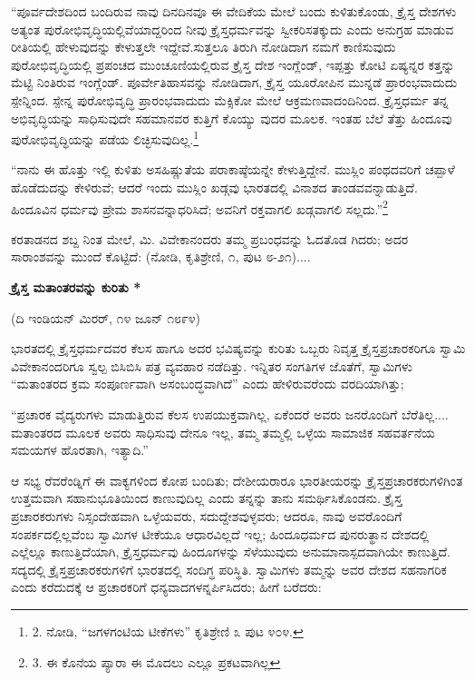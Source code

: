 “ಪೂರ್ವದೇಶದಿಂದ ಬಂದಿರುವ ನಾವು ದಿನದಿನವೂ ಈ ವೇದಿಕೆಯ ಮೇಲೆ ಬಂದು ಕುಳಿತುಕೊಂಡು, ಕ್ರೈಸ್ತ ದೇಶಗಳು ಅತ್ಯಂತ ಪುರೋಭಿವೃದ್ಧಿಯಲ್ಲಿವೆಯಾದ್ದರಿಂದ ನೀವು ಕ್ರೈಸ್ತಧರ್ಮವನ್ನು ಸ್ವೀಕರಿಸತಕ್ಕುದು ಎಂದು ಅನುಗ್ರಹ ಮಾಡುವ ರೀತಿಯಲ್ಲಿ ಹೇಳುವುದನ್ನು ಕೇಳುತ್ತಲೇ ಇದ್ದೇವೆ.ಸುತ್ತಲೂ ತಿರುಗಿ ನೋಡಿದಾಗ ನಮಗೆ ಕಾಣಿಸುವುದು ಪುರೋಭಿವೃದ್ಧಿಯಲ್ಲಿ ಪ್ರಪಂಚದ ಮುಂಚೂಣಿಯಲ್ಲಿರುವ ಕ್ರೈಸ್ತ ದೇಶ ಇಂಗ್ಲೆಂಡ್, ಇಪ್ಪತ್ತು ಕೋಟಿ ಏಷ್ಯನ್ನರ ಕತ್ತನ್ನು ಮೆಟ್ಟಿ ನಿಂತಿರುವ ಇಂಗ್ಲೆಂಡ್. ಪೂರ್ವೇತಿಹಾಸವನ್ನು ನೋಡಿದಾಗ, ಕ್ರೈಸ್ತ ಯೂರೋಪಿನ ಮುನ್ನಡೆ ಪ್ರಾರಂಭವಾದುದು ಸ್ಪೇನ್ನಿಂದ. ಸ್ಪೇನ್ನ ಪುರೋಭಿವೃದ್ಧಿ ಪ್ರಾರಂಭವಾದುದು ಮೆಕ್ಸಿಕೋ ಮೇಲೆ ಆಕ್ರಮಣವಾದಂದಿನಿಂದ. ಕ್ರೈಸ್ತಧರ್ಮ ತನ್ನ ಅಭಿವೃದ್ಧಿಯನ್ನು ಸಾಧಿಸುವುದೇ ಸಹಮಾನವರ ಕುತ್ತಿಗೆ ಕೊಯ್ಯು ವುದರ ಮೂಲಕ. ಇಂತಹ ಬೆಲೆ ತೆತ್ತು ಹಿಂದೂವು ಪುರೋಭಿವೃದ್ಧಿಯನ್ನು ಪಡೆಯ ಲಿಚ್ಛಿಸುವುದಿಲ್ಲ.\footnote{2. ನೋಡಿ, “ಜಗಳಗಂಟಿಯ ಟೀಕೆಗಳು” ಕೃತಿಶ್ರೇಣಿ ೩ ಪುಟ ೪೦೪.}

“ನಾನು ಈ ಹೊತ್ತು ಇಲ್ಲಿ ಕುಳಿತು ಅಸಹಿಷ್ಣುತೆಯ ಪರಾಕಾಷ್ಠೆಯನ್ನೇ ಕೇಳುತ್ತಿದ್ದೇನೆ. ಮುಸ್ಲಿಂ ಪಂಥದವರಿಗೆ ಚಪ್ಪಾಳೆ ಹೊಡೆದುದನ್ನು ಕೇಳಿರುವೆ; ಆದರೆ ಇಂದು ಮುಸ್ಲಿಂ ಖಡ್ಗವು ಭಾರತದಲ್ಲಿ ವಿನಾಶದ ತಾಂಡವವನ್ನಾಡುತ್ತಿದೆ. ಹಿಂದೂವಿನ ಧರ್ಮವು ಪ್ರೇಮ ಶಾಸನವನ್ನಾಧರಿಸಿದೆ; ಅವನಿಗೆ ರಕ್ತವಾಗಲಿ ಖಡ್ಗವಾಗಲಿ ಸಲ್ಲದು.”\footnote{3. ಈ ಕೊನೆಯ ಪ್ಯಾರಾ ಈ ಮೊದಲು ಎಲ್ಲೂ ಪ್ರಕಟವಾಗಿಲ್ಲ}

ಕರತಾಡನದ ಶಬ್ದ ನಿಂತ ಮೇಲೆ, ಮಿ. ವಿವೇಕಾನಂದರು ತಮ್ಮ ಪ್ರಬಂಧವನ್ನು ಓದತೊಡ ಗಿದರು; ಅದರ ಸಾರಾಂಶವನ್ನು ಮುಂದೆ ಕೊಟ್ಟಿದೆ: (ನೋಡಿ, ಕೃತಿಶ್ರೇಣಿ, ೧, ಪುಟ ೮-೨೧)....

\begin{center}
\textbf{ಕ್ರೈಸ್ತ ಮತಾಂತರವನ್ನು ಕುರಿತು *}
\end{center}

\begin{center}
(ದಿ ಇಂಡಿಯನ್ ಮಿರರ್, ೧೪ ಜೂನ್ ೧೮೯೪)
\end{center}

ಭಾರತದಲ್ಲಿ ಕ್ರೈಸ್ತಧರ್ಮದವರ ಕೆಲಸ ಹಾಗೂ ಅದರ ಭವಿಷ್ಯವನ್ನು ಕುರಿತು ಒಬ್ಬರು ನಿವೃತ್ತ ಕ್ರೈಸ್ತಪ್ರಚಾರಕರಿಗೂ ಸ್ವಾಮಿ ವಿವೇಕಾನಂದರಿಗೂ ಸ್ವಲ್ಪ ಬಿಸಿಬಿಸಿ ಪತ್ರ ವ್ಯವಹಾರ ನಡೆದಿತ್ತು. ಇನ್ನಿತರ ಸಂಗತಿಗಳ ಜೊತೆಗೆ, ಸ್ವಾಮಿಗಳು “ಮತಾಂತರದ ಕ್ರಮ ಸಂಪೂರ್ಣವಾಗಿ ಅಸಂಬಂದ್ಧವಾಗಿದೆ” ಎಂದು ಹೇಳಿರುವರೆಂದು ವರದಿಯಾಗಿತ್ತು;

“ಪ್ರಚಾರಕ ವೈದ್ಯರುಗಳು ಮಾಡುತ್ತಿರುವ ಕೆಲಸ ಉಪಯುಕ್ತವಾಗಿಲ್ಲ, ಏಕೆಂದರೆ ಅವರು ಜನರೊಂದಿಗೆ ಬೆರೆತಿಲ್ಲ.... ಮತಾಂತರದ ಮೂಲಕ ಅವರು ಸಾಧಿಸುವು ದೇನೂ ಇಲ್ಲ, ತಮ್ಮ ತಮ್ಮಲ್ಲಿ ಒಳ್ಳೆಯ ಸಾಮಾಜಿಕ ಸಹವರ್ತನೆಯ ಸಮಯಗಳ ಹೊರತಾಗಿ, ಇತ್ಯಾದಿ.”

ಆ ಸಭ್ಯ ರೆವರೆಂಡ್ನಿಗೆ ಈ ವಾಕ್ಯಗಳಿಂದ ಕೋಪ ಬಂದಿತು; ದೇಶೀಯರಾರೂ ಭಾರತೀಯರನ್ನು ಕ್ರೈಸ್ತಪ್ರಚಾರಕರುಗಳಿಗಿಂತ ಉತ್ತಮವಾಗಿ ಸಹಾನುಭೂತಿಯಿಂದ ಕಾಣುವುದಿಲ್ಲ ಎಂದು ತನ್ನನ್ನು ತಾನು ಸಮರ್ಥಿಸಿಕೊಂಡನು. ಕ್ರೈಸ್ತ ಪ್ರಚಾರಕರುಗಳು ನಿಸ್ಸಂದೇಹವಾಗಿ ಒಳ್ಳೆಯವರು, ಸದುದ್ದೇಶವುಳ್ಳವರು; ಆದರೂ, ನಾವು ಅವರೊಂದಿಗೆ ಸಂಪರ್ಕದಲ್ಲಿಲ್ಲವೆಂಬ ಸ್ವಾಮಿಗಳ ಟೀಕೆಯೂ ಆಧಾರವಿಲ್ಲದೆ ಇಲ್ಲ; ಹಿಂದೂಧರ್ಮದ ಪುನರುತ್ಥಾನ ದೇಶದಲ್ಲಿ ಎಲ್ಲೆಲ್ಲೂ ಕಾಣುತ್ತಿದೆಯಾಗಿ, ಕ್ರೈಸ್ತಧರ್ಮವು ಹಿಂದೂಗಳನ್ನು ಸೆಳೆಯುವುದು ಅನುಮಾನಾಸ್ಪದವಾಗಿಯೇ ಕಾಣುತ್ತಿದೆ. ಸದ್ಯದಲ್ಲಿ ಕ್ರೈಸ್ತಪ್ರಚಾರಕರುಗಳಿಗೆ ಭಾರತದಲ್ಲಿ ಸಂದಿಗ್ಧ ಪರಿಸ್ಥಿತಿ. ಸ್ವಾಮಿಗಳು ತಮ್ಮನ್ನು ಅವರ ದೇಶದ ಸಹನಾಗರಿಕ ಎಂದು ಕರೆದುದಕ್ಕೆ ಆ ಪ್ರಚಾರಕರಿಗೆ ಧನ್ಯವಾದಗಳನ್ನರ್ಪಿಸಿದರು; ಹೀಗೆ ಬರೆದರು:

